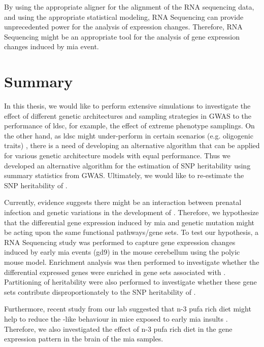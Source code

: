 	By using the appropriate aligner for the alignment of the RNA sequencing data, and using the appropriate statistical modeling, RNA Sequencing can provide unprecedented power for the analysis of expression changes.
	Therefore, RNA Sequencing might be an appropriate tool for the analysis of gene expression changes induced by \gls{mia} event.
	
	\section{Summary}
	In this thesis, we would like to perform extensive simulations to investigate the effect of different genetic architectures and sampling strategies in \gls{GWAS} to the performance of \gls{ldsc}, for example, the effect of extreme phenotype samplings.
	On the other hand, as \gls{ldsc} might under-perform in certain scenarios (e.g. oligogenic traits) \citep{Bulik-Sullivan2015}, there is a need of developing an alternative algorithm that can be applied for various genetic architecture models with equal performance.
	Thus we developed an alternative algorithm for the estimation of \gls{SNP} heritability using summary statistics from \gls{GWAS}.
	Ultimately, we would like to re-estimate the \gls{SNP} heritability of .

	Currently, evidence suggests there might be an interaction between prenatal infection and genetic variations in the development of  \citep{Tienari2004,Clarke2009}.
	Therefore, we hypothesize that the differential gene expression induced by \gls{mia} and genetic mutation might be acting upon the same functional pathways/gene sets.
	To test our hypothesis, a RNA Sequencing study was performed to capture gene expression changes induced by early \gls{mia} events (\gls{gd}9) in the mouse cerebellum using the \gls{polyic} mouse model.
	Enrichment analysis was then performed to investigate whether the differential expressed genes were enriched in gene sets associated with .
	Partitioning of heritability were also performed to investigate whether these gene sets contribute disproportionately to the \gls{SNP} heritability of .
	
	Furthermore, recent study from our lab suggested that n-3 \gls{pufa} rich diet might help to reduce the -like behaviour in mice exposed to early \gls{mia} insults \citep{Li2015}.
	Therefore, we also investigated the effect of n-3 \gls{pufa} rich diet in the gene expression pattern in the brain of the \gls{mia} samples. 
	
